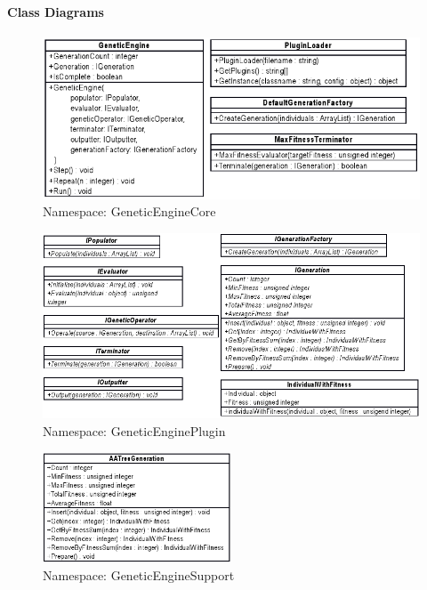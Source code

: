 \paragraph{Class Diagrams}

\begin{figure}[ht!]
 \caption{Namespace: GeneticEngineCore}\label{fig:GeneticEngineCore}
 \centering
 \includegraphics[width=\textwidth]{../GeneticEngineCoreDetail.png}
\end{figure}

\begin{figure}[ht!]
 \caption{Namespace: GeneticEnginePlugin}\label{fig:GeneticEnginePlugin}
 \centering
 \includegraphics[width=\textwidth]{../GeneticEnginePluginDetail.png}
\end{figure}

\begin{figure}[ht!]
 \caption{Namespace: GeneticEngineSupport}\label{fig:GeneticEngineSupport}
 \centering
 \includegraphics[width=0.5\textwidth]{../GeneticEngineSupportDetail.png}
\end{figure}


